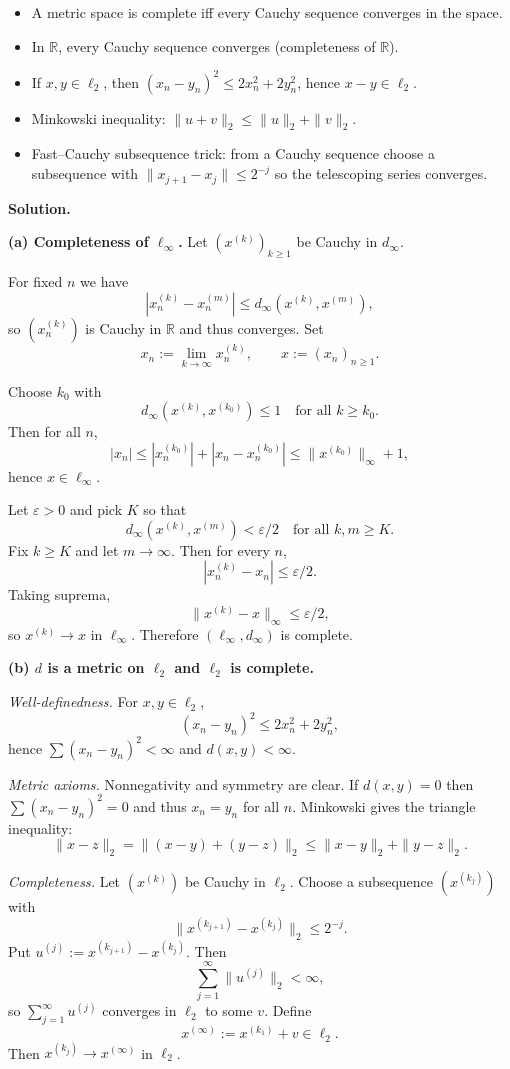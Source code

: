 \documentclass[12pt,a4paper]{article}
\begin{document}
\begin{itemize}
	\item A metric space is complete iff every Cauchy sequence converges in the space.
	\item In $\mathbb R$, every Cauchy sequence converges (completeness of $\mathbb R$).
	\item If $x,y\in\ell_2$, then $(x_n-y_n)^2\le 2x_n^2+2y_n^2$, hence $x-y\in\ell_2$.
	\item Minkowski inequality: $\|u+v\|_2\le \|u\|_2+\|v\|_2$.
	\item Fast–Cauchy subsequence trick: from a Cauchy sequence choose a subsequence with
	$\|x_{j+1}-x_j\|\le 2^{-j}$ so the telescoping series converges.
\end{itemize}

\medskip\medskip
\textbf{Solution.}

\textbf{(a) Completeness of $\ell_\infty$.}
Let $(x^{(k)})_{k\ge1}$ be Cauchy in $d_\infty$.

For fixed $n$ we have
\[
|x^{(k)}_n-x^{(m)}_n|\le d_\infty(x^{(k)},x^{(m)}),
\]
so $(x^{(k)}_n)$ is Cauchy in $\mathbb R$ and thus converges.
Set
\[
x_n:=\lim_{k\to\infty}x^{(k)}_n,
\qquad
x:=(x_n)_{n\ge1}.
\]

Choose $k_0$ with
\[
d_\infty(x^{(k)},x^{(k_0)})\le 1
\quad\text{for all }k\ge k_0.
\]
Then for all $n$,
\[
|x_n|\le |x^{(k_0)}_n|+|x_n-x^{(k_0)}_n|
\le \|x^{(k_0)}\|_\infty+1,
\]
hence $x\in\ell_\infty$.

Let $\varepsilon>0$ and pick $K$ so that
\[
d_\infty(x^{(k)},x^{(m)})<\varepsilon/2
\quad\text{for all }k,m\ge K.
\]
Fix $k\ge K$ and let $m\to\infty$.
Then for every $n$,
\[
|x^{(k)}_n-x_n|\le \varepsilon/2.
\]
Taking suprema,
\[
\|x^{(k)}-x\|_\infty\le \varepsilon/2,
\]
so $x^{(k)}\to x$ in $\ell_\infty$.
Therefore $(\ell_\infty,d_\infty)$ is complete.

\medskip
\textbf{(b) $d$ is a metric on $\ell_2$ and $\ell_2$ is complete.}

\emph{Well-definedness.}
For $x,y\in\ell_2$,
\[
(x_n-y_n)^2\le 2x_n^2+2y_n^2,
\]
hence $\sum (x_n-y_n)^2<\infty$ and $d(x,y)<\infty$.

\emph{Metric axioms.}
Nonnegativity and symmetry are clear.
If $d(x,y)=0$ then $\sum (x_n-y_n)^2=0$ and thus $x_n=y_n$ for all $n$.
Minkowski gives the triangle inequality:
\[
\|x-z\|_2=\|(x-y)+(y-z)\|_2
\le \|x-y\|_2+\|y-z\|_2.
\]

\emph{Completeness.}
Let $(x^{(k)})$ be Cauchy in $\ell_2$.
Choose a subsequence $(x^{(k_j)})$ with
\[
\|x^{(k_{j+1})}-x^{(k_j)}\|_2\le 2^{-j}.
\]
Put $u^{(j)}:=x^{(k_{j+1})}-x^{(k_j)}$.
Then
\[
\sum_{j=1}^\infty \|u^{(j)}\|_2<\infty,
\]
so $\sum_{j=1}^\infty u^{(j)}$ converges in $\ell_2$ to some $v$.
Define
\[
x^{(\infty)}:=x^{(k_1)}+v \in \ell_2.
\]
Then $x^{(k_j)}\to x^{(\infty)}$ in $\ell_2$.
\end{document}
